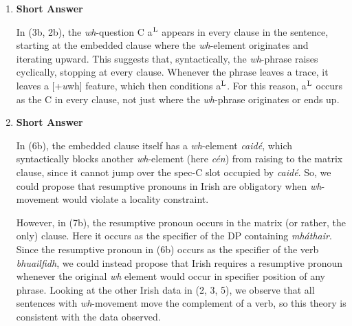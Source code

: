 \documentclass[a4paper, 11pt]{article}
\begin{document}
\begin{enumerate}[label=\textbf{\arabic*.}]
\begin{enumerate}[label=(\alph*)]
    \end{enumerate}

\item \textbf{Short Answer}

In (3b, 2b), the \emph{wh}-question C a$\textsuperscript{L}$ appears in every clause
in the sentence, starting at the embedded clause where the \emph{wh}-element originates and
iterating upward. This suggests that, syntactically, the \emph{wh}-phrase raises cyclically,
stopping at every clause. Whenever the phrase leaves a trace, it leaves a [+\emph{u}wh] feature,
which then conditions a$\textsuperscript{L}$. For this reason, a$\textsuperscript{L}$ occurs as the
C in every clause, not just where the \emph{wh}-phrase originates or ends up.


\item \textbf{Short Answer}

In (6b), the embedded clause itself has a \emph{wh}-element \emph{caidé}, which syntactically
blocks another \emph{wh}-element (here \emph{cén}) from raising to the matrix clause, since it
cannot jump over the spec-C slot occupied by \emph{caidé}. So, we could propose that resumptive
pronouns in Irish are obligatory when \emph{wh}-movement would violate a locality constraint.

However, in (7b), the resumptive pronoun occurs in the matrix (or rather, the only) clause. Here
it occurs as the specifier of the DP containing \emph{mháthair}. Since the resumptive pronoun in
(6b) occurs as the specifier of the verb \emph{bhuailfidh}, we could instead propose that Irish
requires a resumptive pronoun whenever the original \emph{wh} element would occur in specifier position
of any phrase. Looking at the other Irish data in (2, 3, 5), we observe that all sentences with
\emph{wh}-movement move the complement of a verb, so this theory is consistent with the data
observed.

\end{enumerate}
\end{document}
